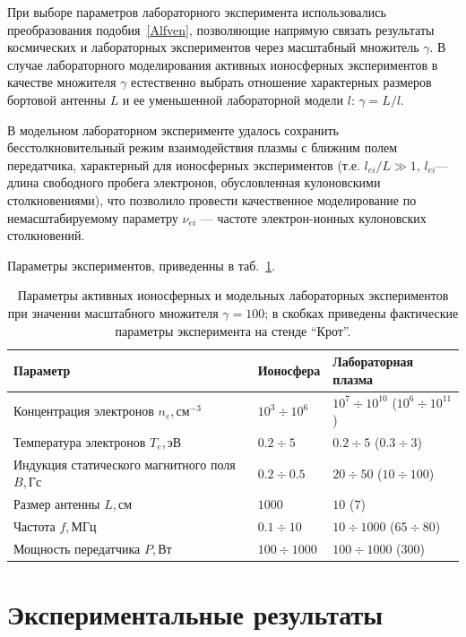 \documentclass[autoref,10pt]{disser}
\begin{document}
При выборе параметров лабораторного эксперимента использовались преобразования подобия~\ref{Alfven}, позволяющие напрямую связать результаты космических и лабораторных экспериментов через масштабный множитель $\gamma$. В случае лабораторного моделирования активных ионосферных экспериментов в качестве множителя $\gamma$ естественно выбрать отношение характерных размеров бортовой антенны $L$ и ее уменьшенной лабораторной модели $l$: $\gamma{}=L/l$. 

В модельном лабораторном эксперименте удалось сохранить бесстолкновительный режим взаимодействия плазмы с ближним полем передатчика, характерный для ионосферных экспериментов (т.е. $l_{ei}/L\gg{}1$, $l_{ei}$---длина свободного пробега электронов, обусловленная кулоновскими столкновениями), что позволило провести качественное моделирование по немасштабируемому параметру $\nu_{ei}$ --- частоте электрон-ионных кулоновских столкновений.

Параметры экспериментов, приведенны в \mbox{таб.~\ref{tab:value_scaling_ionosphere}}.
\begin{table}[H]
{
   \hfill{}
   \small
   \centering %
   \begin{tabular}{|m{3cm}|m{2.3cm}|m{4.5cm}|}
     \hline
     \textbf{Параметр} & \textbf{Ионосфера} & \textbf{Лабораторная плазма}\\\hline
     Концентрация электронов $n_{e}$,\,см$^{-3}$ & $10^{3}\div{}10^{6}$ & $10^{7}\div{}10^{10}$ ($10^{6}\div{}10^{11}$)\\\hline
     Температура электронов $T_{e}$,\,эВ & $0.2\div5$ & $0.2\div5$ ($0.3\div3$)\\\hline
     Индукция статического магнитного поля $B$,\,Гс & $0.2\div0.5$ & $20\div50$ ($10\div100$)\\\hline
     Размер антенны $L$,\,см & $1000$ & $10$ ($7$)\\\hline
     Частота $f$,\,МГц &$0.1\div10$& $10\div{}1000$ ($65\div 80$)\\\hline
     Мощность передатчика $P$,\,Вт &$100\div1000$& $100\div1000$ ($300$)\\\hline
   \end{tabular}
   \hfill{}
}
\caption{Параметры активных ионосферных и модельных лабораторных экспериментов при значении масштабного множителя $\gamma = 100$; в скобках приведены фактические параметры эксперимента на стенде ``Крот''.}
   \label{tab:value_scaling_ionosphere}
\end{table}
\section{Экспериментальные результаты}
\end{document}
